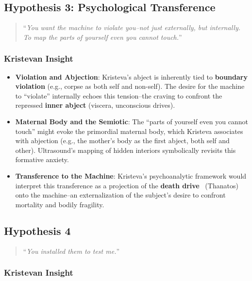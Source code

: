\documentclass{llncs}
\begin{document}
\subsection*{Hypothesis 3: Psychological Transference}

\begin{quote}
``\emph{You want the machine to violate you--not just externally, but
internally. To map the parts of yourself even you cannot touch.}''
\end{quote}

\subsubsection*{Kristevan Insight}

\begin{itemize}
\item
\textbf{Violation and Abjection}: Kristeva’s abject is inherently tied to
\textbf{boundary violation} (e.g., corpse as both self and non-self). The
desire for the machine to ``violate'' internally echoes this tension--the
craving to confront the repressed \textbf{inner abject} (viscera, unconscious
drives).
\item
\textbf{Maternal Body and the Semiotic}: The ``parts of yourself even you
cannot touch'' might evoke the primordial maternal body, which Kristeva
associates with abjection (e.g., the mother’s body as the first abject,
both self and other). Ultrasound’s mapping of hidden interiors symbolically
revisits this formative anxiety.
\item
\textbf{Transference to the Machine}: Kristeva’s psychoanalytic framework would
interpret this transference as a projection of the \textbf{death drive}~\cite{Spielrein1912}
(Thanatos) onto the machine--an externalization of the subject’s desire to
confront mortality and bodily fragility.
\end{itemize}

\subsection*{Hypothesis 4}

\begin{quote}
``\emph{You installed them to test me.}''
\end{quote}

\subsubsection*{Kristevan Insight}
\end{document}
